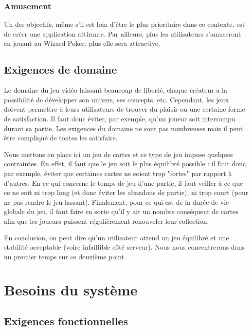 \documentclass[11pt,a4paper]{article}
\begin{document}
\subsubsection*{Amusement}
Un des objectifs, même s'il est loin d'être le plus prioritaire dans ce contexte, est de créer une application attirante. Par ailleurs, plus les utilisateurs s'amuseront en jouant au Wizard Poker, plus elle sera attractive.


\subsection{Exigences de domaine}
\label{sec:exi-dom}

Le domaine du jeu vidéo laissant beaucoup de liberté, chaque créateur a la possibilité de développer son univers, ses concepts, etc.  Cependant, les jeux doivent permettre à leurs utilisateurs de trouver du plaisir ou une certaine forme de satisfaction.  Il faut donc éviter, par exemple, qu'un joueur soit interrompu durant sa partie.  Les exigences du domaine ne sont pas nombreuses mais il peut être compliqué de toutes les satisfaire.

\medbreak

Nous mettons en place ici un jeu de cartes et ce type de jeu impose quelques contraintes.  En effet, il faut que le jeu soit le plus équilibré possible : il faut donc, par exemple, éviter que certaines cartes ne soient trop "fortes" par rapport à d'autres.  En ce qui concerne le temps de jeu d'une partie, il faut veiller à ce que ce ne soit ni trop long (et donc éviter les abandons de partie), ni trop court (pour ne pas rendre le jeu lassant). Finalement, pour ce qui est de la durée de vie globale du jeu, il faut faire en sorte qu'il y ait un nombre conséquent de cartes afin que les joueurs puissent régulièrement renouveler leur collection.

\medbreak

En conclusion, on peut dire qu'un utilisateur attend un jeu équilibré et une stabilité acceptable (voire infaillible côté serveur).  Nous nous concentrerons dans un premier temps sur ce deuxième point.



\section{Besoins du système}
\label{sec:besoins-sys}

\subsection{Exigences fonctionnelles}
\label{sec:exi-fonc-sys}
\end{document}
